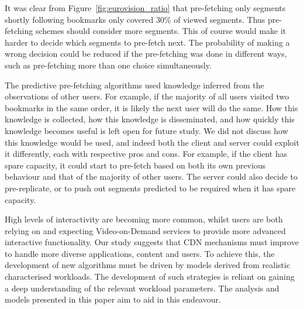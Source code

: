 \documentclass[a4paper,11pt]{article}
\begin{document}
It was clear from Figure~\ref{fig:eurovision_ratio} that pre-fetching only segments shortly following bookmarks only covered 30\% of viewed segments. Thus pre-fetching schemes should consider more segments. This of course would make it harder to decide which segments to pre-fetch next. The probability of making a wrong decision could be reduced if the pre-fetching was done in different ways, such as pre-fetching more than one choice simultaneously.


The predictive pre-fetching algorithms used knowledge inferred from the observations of other users. For example, if the majority of all users visited two bookmarks in the same order, it is likely the next user will do the same. How this knowledge is collected, how this knowledge is disseminated, and how quickly this knowledge becomes useful is left open for future study. We did not discuss how this knowledge would be used, and indeed both the client and server could exploit it differently, each with respective pros and cons. For example, if the client has spare capacity, it could start to pre-fetch based on both its own previous behaviour and that of the majority of other users. The server could also decide to pre-replicate, or to push out segments predicted to be required when it has spare capacity.

High levels of interactivity are becoming more common, whilst users are both relying on and expecting Video-on-Demand services to provide more advanced interactive functionality. Our study suggests that CDN mechanisms must improve to handle more diverse applications, content and users. To achieve this, the development of new algorithms must be driven by models derived from realistic characterised workloads. The development of such strategies is reliant on gaining a deep understanding of the relevant workload parameters. The analysis and models presented in this paper aim to aid in this endeavour.



\end{document}
